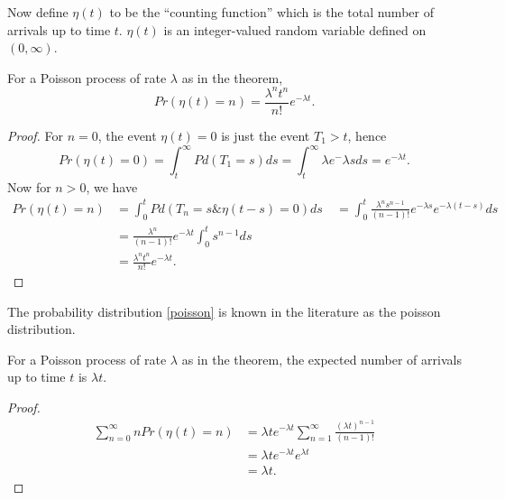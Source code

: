 \documentclass[12pt,leqno]{article}
\begin{document}
Now define $\eta(t)$ to be the ``counting function'' which is the total number of arrivals up to time $t$. $\eta(t)$
is an integer-valued random variable defined on $(0,\infty)$.
\begin{Cor}
  For a Poisson process of rate $\lambda$ as in the theorem, 
  \begin{equation}\label{poisson}
  Pr(\eta(t) = n) = \frac{\lambda^nt^{n}}{n!}e^{-\lambda{t}}.
  \end{equation}
  \begin{proof}
    For $n = 0$, the event $\eta(t) = 0$ is just the event $T_1 > t$, hence
    $$
    Pr(\eta(t) = 0) = \int_t^{\infty}Pd(T_1 = s)ds = \int_t^{\infty}{\lambda}e^-{\lambda{s}}ds = e^{-\lambda{t}}.
    $$
    Now for $n > 0$, we have
    \begin{align*}
      Pr(\eta(t) = n) &= \int_0^tPd(T_n = s \& \eta(t-s) = 0)ds\
      &= \int_0^t\frac{\lambda^ns^{n-1}}{(n-1)!}e^{-\lambda{s}}e^{-\lambda(t-s)}ds\\
      &=\frac{\lambda^n}{(n-1)!}e^{-\lambda{t}}\int_0^t s^{n-1}ds\\
      &= \frac{\lambda^nt^{n}}{n!}e^{-\lambda{t}}.
    \end{align*}
  \end{proof}
\end{Cor}
The probability distribution \eqref{poisson} is known in the literature as the poisson distribution.

\begin{Cor}
  For a Poisson process of rate $\lambda$ as in the theorem, 
  the expected number of arrivals up to time $t$ is $\lambda{t}$.
  \begin{proof}
    \begin{align*}
      \sum_{n=0}^{\infty}nPr(\eta(t) = n) &= \lambda{t}e^{-\lambda{t}}\sum_{n=1}^{\infty}\frac{(\lambda{t})^{n-1}}{(n-1)!}\\
      &=\lambda{t}e^{-\lambda{t}}e^{\lambda{t}}\\
      &= \lambda{t}.
    \end{align*}
  \end{proof}
\end{Cor}
        
   
\end{document}
